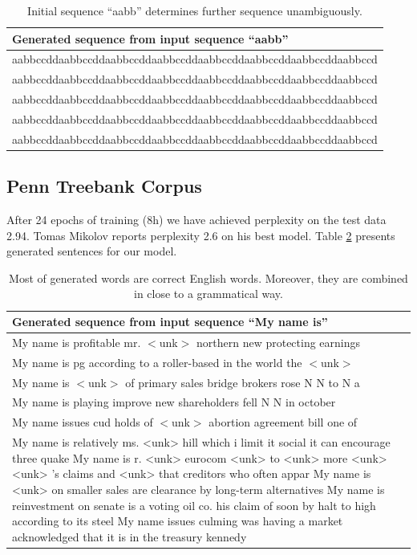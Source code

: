 \documentclass{article}
\begin{document}
\begin{table}[t]
\tiny
\centering
\begin{tabular}{l}
\hline
Generated sequence from input sequence ``aabb'' \\
\hline
 aabbccddaabbccddaabbccddaabbccddaabbccddaabbccddaabbccddaabbccd\\
 aabbccddaabbccddaabbccddaabbccddaabbccddaabbccddaabbccddaabbccd\\
 aabbccddaabbccddaabbccddaabbccddaabbccddaabbccddaabbccddaabbccd\\
 aabbccddaabbccddaabbccddaabbccddaabbccddaabbccddaabbccddaabbccd\\
 aabbccddaabbccddaabbccddaabbccddaabbccddaabbccddaabbccddaabbccd\\
\hline
\end{tabular}
\caption{Initial sequence ``aabb'' determines further sequence unambiguously.}
        \label{tab:aabb}
\end{table}



\subsection{Penn Treebank Corpus}
After 24 epochs of training (8h) we have achieved perplexity on the test data 2.94. 
Tomas Mikolov reports perplexity 2.6 on his best model.
Table \ref{tab:penn} presents generated sentences for our model.


\begin{table}[t]
\tiny
\centering
\begin{tabular}{l}
\hline
Generated sequence from input sequence ``My name is'' \\
\hline
 My name is profitable mr. $<$unk$>$ northern new protecting earnings\\ 
 My name is pg according to a roller-based in the world the $<$unk$>$\\
 My name is $<$unk$>$ of primary sales bridge brokers rose N N to N a\\
 My name is playing improve new shareholders fell N N in october \\
 My name issues cud holds of $<$unk$>$ abortion agreement bill one of\\

My name is relatively ms. <unk> hill which i limit it social it can encourage three quake
My name is r. <unk> eurocom <unk> to <unk> more <unk> <unk> 's claims and <unk> that creditors who often appar
My name is <unk> on smaller sales are clearance by long-term alternatives
My name is reinvestment on senate is a voting oil co. his claim of soon by halt to high according to its steel
My name issues culming was having a market acknowledged that it is in the treasury kennedy

\hline
\end{tabular}
\caption{Most of generated words are correct English words. Moreover, they
are combined in close to a grammatical way.}
        \label{tab:penn}
\end{table}
\end{document}
